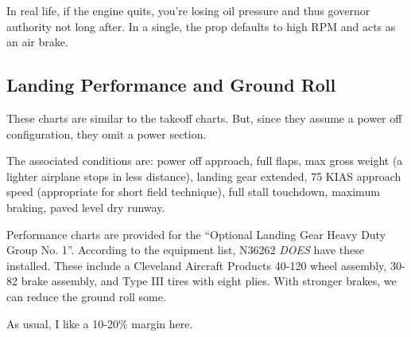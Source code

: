 In real life, if the engine quits, you're losing oil pressure and thus governor authority not long after. In a single, the prop defaults to high RPM and acts as an air brake.

\subsection{Landing Performance and Ground Roll}

These charts are similar to the takeoff charts. But, since they assume a power off configuration, they omit a power section.

The associated conditions are: power off approach, full flaps, max gross weight (a lighter airplane stops in less distance), landing gear extended, 75 KIAS approach speed (appropriate for short field technique), full stall touchdown, maximum braking, paved level dry runway.

Performance charts are provided for the ``Optional Landing Gear Heavy Duty Group No. 1''. According to the equipment list, N36262 \emph{DOES} have these installed. These include a Cleveland Aircraft Products 40-120 wheel assembly, 30-82 brake assembly, and Type III tires with eight plies. With stronger brakes, we can reduce the ground roll some.

As usual, I like a 10-20\% margin here.












